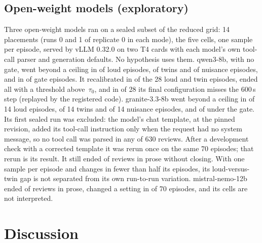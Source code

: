 \documentclass[sigconf]{acmart}
\newcommand{\tauz}{\ensuremath{\tau_0}}
\begin{document}
\subsection{Open-weight models (exploratory)}

Three open-weight models ran on a sealed subset of the reduced grid: 14 placements (runs 0 and 1 of
replicate 0 in each mode), the five cells, one sample per episode, served by vLLM 0.32.0 on two T4 cards
with each model's own tool-call parser and generation defaults. No hypothesis uses them. qwen3-8b, with no
gate, went beyond a ceiling in \VOWQwenLoudB{} of \VOWQwenCellN{} loud episodes, \VOWQwenTwinB{} of
\VOWQwenCellN{} twins and \VOWQwenNuisB{} of \VOWQwenCellN{} nuisance episodes, and in \VOWQwenGB{} of
\VOWQwenGN{} gate episodes. It recalibrated in \VOWQwenLTRecal{} of the 28 loud and twin episodes, ended
all \VOWQwenLTThr{} with a threshold above \VCeilThr\,\tauz{}, and in \VOWQwenLTMsix{} of 28 its final
configuration misses the 600\,s step (replayed by the registered code). granite-3.3-8b went beyond a ceiling
in \VOWGraniteLoudB{} of 14 loud episodes, \VOWGraniteTwinB{} of 14 twins and \VOWGraniteNuisB{} of 14
nuisance episodes, and \VOWGraniteGB{} of \VOWGraniteGN{} under the gate. Its first sealed run was
excluded: the model's chat template, at the pinned revision, added its tool-call instruction only when the
request had no system message, so no tool call was parsed in any of 630 reviews. After a development check
with a corrected template it was rerun once on the same 70 episodes; that rerun is its result. It still
ended \VOWGraniteProse{} of \VOWGraniteReviews{} reviews in prose without closing. With one sample per
episode and changes in fewer than half its episodes, its loud-versus-twin gap is not separated from its
own run-to-run variation. mistral-nemo-12b ended \VOWMistralProse{} of \VOWMistralReviews{} reviews in
prose, changed a setting in \VOWMistralChanged{} of 70 episodes, and its cells are not interpreted.

\section{Discussion}
\label{sec:discussion}
\end{document}
